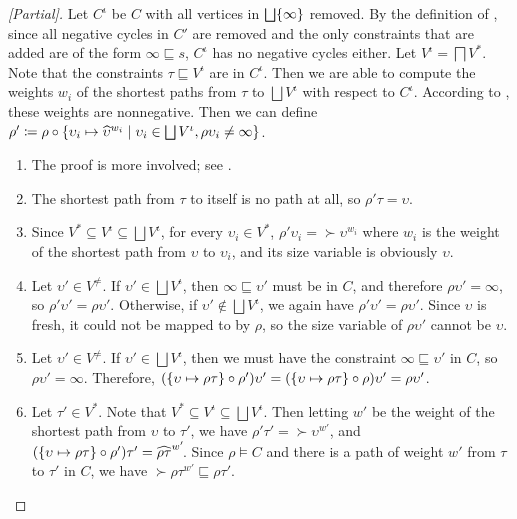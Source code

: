 \begin{proof}[{[Partial]}]
Let $C^\iota$ be $C$ with all vertices in $\bigsqcup \{\infty\}$ removed.
By the definition of \RecCheck, since all negative cycles in $C'$ are removed and the only constraints that are added are of the form $\infty \sqsubseteq s$,
$C^\iota$ has no negative cycles either.
Let $V^\iota = \bigsqcap V^*$.
Note that the constraints $\tau \sqsubseteq V^\iota$ are in $C^\iota$.
Then we are able to compute the weights $w_i$ of the shortest paths from $\tau$ to $\bigsqcup V^\iota$ with respect to $C^\iota$.
According to \citet{f-hat}, these weights are nonnegative.
Then we can define $\rho' \coloneqq \rho \circ \{\upsilon_i \mapsto \widehat{\upsilon}^{w_i} \mid \upsilon_i \in \bigsqcup V^\iota, \rho\upsilon_i \neq \infty\}$.

\begin{enumerate}
  \item The proof is more involved; see \citet{f-hat}.
  \item The shortest path from $\tau$ to itself is no path at all, so $\rho'\tau = \upsilon$.
  \item Since $V^* \subseteq V^\iota \subseteq \bigsqcup V^\iota$, for every $\upsilon_i \in V^*$, $\rho'\upsilon_i = \succ{\upsilon}^{w_i}$ where $w_i$ is the weight of the shortest path from $\upsilon$ to $\upsilon_i$, and its size variable is obviously $\upsilon$.
  \item Let $\upsilon' \in V^\neq$. If $\upsilon' \in \bigsqcup V^\iota$, then $\infty \sqsubseteq \upsilon'$ must be in $C$, and therefore $\rho\upsilon' = \infty$, so $\rho'\upsilon' = \rho\upsilon'$. Otherwise, if $\upsilon' \notin \bigsqcup V^\iota$, we again have $\rho'\upsilon' = \rho\upsilon'$. Since $\upsilon$ is fresh, it could not be mapped to by $\rho$, so the size variable of $\rho\upsilon'$ cannot be $\upsilon$.
  \item Let $\upsilon' \in V^\neq$. If $\upsilon' \in \bigsqcup V^\iota$, then we must have the constraint $\infty \sqsubseteq \upsilon'$ in $C$, so $\rho\upsilon' = \infty$. Therefore, $(\{\upsilon \mapsto \rho\tau\} \circ \rho')\upsilon' = (\{\upsilon \mapsto \rho\tau\} \circ \rho)\upsilon' = \rho\upsilon'$.
  \item Let $\tau' \in V^*$. Note that $V^* \subseteq V^\iota \subseteq \bigsqcup V^\iota$.
  Then letting $w'$ be the weight of the shortest path from $\upsilon$ to $\tau'$, we have $\rho'\tau' = \succ{\upsilon}^{w'}$, and $(\{\upsilon \mapsto \rho\tau\} \circ \rho')\tau' = \widehat{\rho\tau}^{w'}\!$.
  Since $\rho \vDash C$ and there is a path of weight $w'$ from $\tau$ to $\tau'$ in $C$,
  we have $\succ{\rho\tau}^{w'}\! \sqsubseteq \rho\tau'$.
\end{enumerate}
\end{proof}

